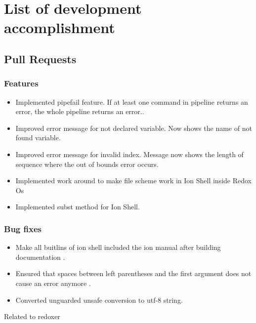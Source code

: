 \chapter{List of development accomplishment}

\section{Pull Requests}

\subsection{Features}

\begin{itemize}
	\item Implemented pipefail feature. If at least one command in pipeline returns an error, the whole pipeline returns an error.\cite{pr_pipefail}.
	\item Improved error message for not declared variable. Now shows the name of not found variable. \cite{pr_better_not_found_variable_show}
	\item Improved error message for invalid index. Message now shows the length of sequence where the out of bounds error occurs.\cite{pr_error_message_shows_invalid_range}
	\item Implemented work around to make file scheme work in Ion Shell inside Redox Os \cite{pr_file_scheme}
	\item Implemented subst method for Ion Shell. \cite{pr_subst_method}
\end{itemize}

\subsection{Bug fixes}

\begin{itemize}
	\item Make all buitlins of ion shell included the ion manual after building documentation \cite{pr_man_history_included_ion_manual}.
	\item Ensured that spaces between left parentheses and the first argument does not cause an error anymore .\cite{pr_fix_space_before_first_paranthese}
	\item Converted unguarded unsafe conversion to utf-8 string. \cite{pr_unsave_utf8_removal}
\end{itemize}

Related to \gls{redoxer}

